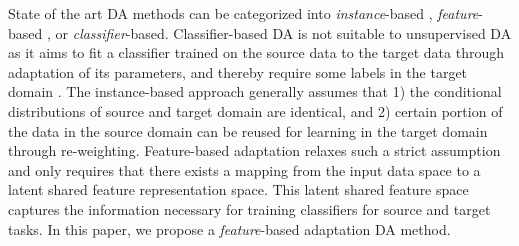 \documentclass[journal,twocolumn]{IEEEtran}
\begin{document}
\begin{CJK*}{UTF8}{gkai}

State of the art DA methods can be categorized into \textit{instance}-based \cite{pan2010survey,donahue2013semi}, \textit{feature}-based \cite{Busto_2017_ICCV,long2013transfer,DBLP:journals/tip/XuFWLZ16}, or \textit{classifier}-based. Classifier-based DA is not suitable to unsupervised DA as it aims to fit a classifier trained on the source data to the target data through adaptation of its parameters, and thereby require some labels in the target domain\cite{tang2017visual} .  The instance-based approach generally assumes that   1) the conditional distributions of source and target domain are identical\cite{Zhang_2017_CVPR}, and 2) certain portion of the data in the source domain can be reused\cite{pan2010survey} for learning in the target domain through re-weighting.
Feature-based adaptation relaxes such a strict assumption and only requires     
 that there exists a mapping from the  input data space to a latent shared feature representation space. This latent shared feature space captures the information necessary for training classifiers for source and target tasks. In this paper, we propose a \textit{feature}-based adaptation DA method. 
 

\end{CJK*}
\end{document}
